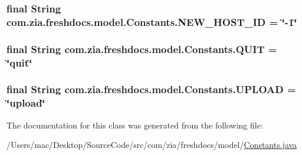 \hypertarget{classcom_1_1zia_1_1freshdocs_1_1model_1_1_constants_a615b002f31536d79b2668a20c41a4b33}{
\subsubsection[{N\-E\-W\-\_\-\-H\-O\-S\-T\-\_\-\-I\-D}]{\setlength{\rightskip}{0pt plus 5cm}final String com.\-zia.\-freshdocs.\-model.\-Constants.\-N\-E\-W\-\_\-\-H\-O\-S\-T\-\_\-\-I\-D = \char`\"{}-\/1\char`\"{}\hspace{0.3cm}{\ttfamily [static]}}}\label{classcom_1_1zia_1_1freshdocs_1_1model_1_1_constants_a615b002f31536d79b2668a20c41a4b33}
\hypertarget{classcom_1_1zia_1_1freshdocs_1_1model_1_1_constants_a8dd73cdd86f6cf83e8227525333eb548}{
\subsubsection[{Q\-U\-I\-T}]{\setlength{\rightskip}{0pt plus 5cm}final String com.\-zia.\-freshdocs.\-model.\-Constants.\-Q\-U\-I\-T = \char`\"{}quit\char`\"{}\hspace{0.3cm}{\ttfamily [static]}}}\label{classcom_1_1zia_1_1freshdocs_1_1model_1_1_constants_a8dd73cdd86f6cf83e8227525333eb548}
\hypertarget{classcom_1_1zia_1_1freshdocs_1_1model_1_1_constants_a461316ea1bc0718a95872aa6afc9b632}{
\subsubsection[{U\-P\-L\-O\-A\-D}]{\setlength{\rightskip}{0pt plus 5cm}final String com.\-zia.\-freshdocs.\-model.\-Constants.\-U\-P\-L\-O\-A\-D = \char`\"{}upload\char`\"{}\hspace{0.3cm}{\ttfamily [static]}}}\label{classcom_1_1zia_1_1freshdocs_1_1model_1_1_constants_a461316ea1bc0718a95872aa6afc9b632}


The documentation for this class was generated from the following file\-:\begin{DoxyCompactItemize}
\item 
/\-Users/mac/\-Desktop/\-Source\-Code/src/com/zia/freshdocs/model/\hyperlink{_constants_8java}{Constants.\-java}\end{DoxyCompactItemize}
